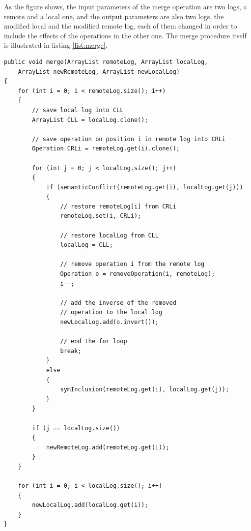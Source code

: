 As the figure shows, the input parameters of the merge operation are two logs, a remote and a local
one, and the output parameters are also two logs, the modified local and the modified remote log, each
of them changed in order to include the effects of the operations in the other one. The merge procedure
itself is illustrated in listing \ref{list:merge}.

\begin{lstlisting}[frame=lines,float=p,caption=the merge procedure,label=list:merge]
public void merge(ArrayList remoteLog, ArrayList localLog,
	ArrayList newRemoteLog, ArrayList newLocalLog)
{
	for (int i = 0; i < remoteLog.size(); i++)
	{
		// save local log into CLL
		ArrayList CLL = localLog.clone();

		// save operation on position i in remote log into CRLi
		Operation CRLi = remoteLog.get(i).clone();

		for (int j = 0; j < localLog.size(); j++)
		{
			if (semanticConflict(remoteLog.get(i), localLog.get(j)))
			{
				// restore remoteLog[i] from CRLi
				remoteLog.set(i, CRLi);

				// restore localLog from CLL
				localLog = CLL;

				// remove operation i from the remote log
				Operation o = removeOperation(i, remoteLog);
				i--;

				// add the inverse of the removed
				// operation to the local log
				newLocalLog.add(o.invert());

				// end the for loop
				break;
			}
			else
			{
				symInclusion(remoteLog.get(i), localLog.get(j));
			}
		}

		if (j == localLog.size())
		{
			newRemoteLog.add(remoteLog.get(i));
		}
	}

	for (int i = 0; i < localLog.size(); i++)
	{
		newLocalLog.add(localLog.get(i));
	}
}
\end{lstlisting}

